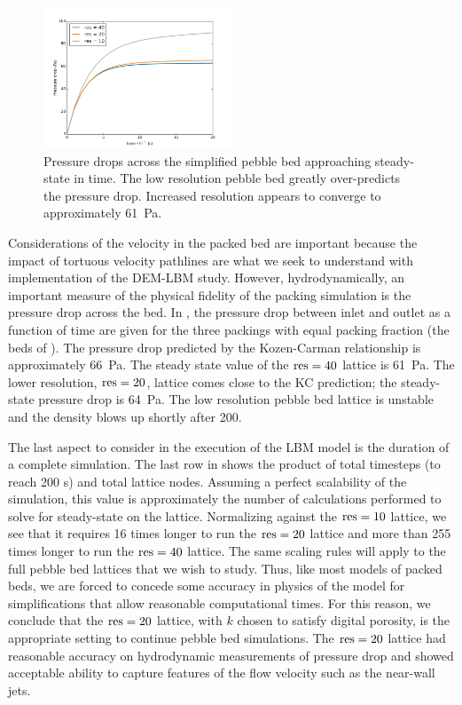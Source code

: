 \begin{figure}[h]
    \centering
    \includegraphics[width=0.5\textwidth]{figures/lbm/3d-study-pressure-drop}
    \caption{Pressure drops across the simplified pebble bed approaching steady-state in time. The low resolution pebble bed greatly over-predicts the pressure drop. Increased resolution appears to converge to approximately \SI{61}{\pascal}.}\label{fig:3d-study-pressure-drop}
\end{figure}

Considerations of the velocity in the packed bed are important because the impact of tortuous velocity pathlines are what we seek to understand with implementation of the DEM-LBM study. However, hydrodynamically, an important measure of the physical fidelity of the packing simulation is the pressure drop across the bed. In , the pressure drop between inlet and outlet as a function of time are given for the three packings with equal packing fraction (the beds of ). The pressure drop predicted by the Kozen-Carman relationship is approximately \SI{66}{\pascal}. The steady state value of the $\text{res}=40$ lattice is \SI{61}{\pascal}. The lower resolution, $\text{res}=20$, lattice comes close to the KC prediction; the steady-state pressure drop is \SI{64}{\pascal}. The low resolution pebble bed lattice is unstable and the density blows up shortly after \SI{200}{\sec}.

The last aspect to consider in the execution of the LBM model is the duration of a complete simulation. The last row in  shows the product of total timesteps (to reach 200 s) and total lattice nodes. Assuming a perfect scalability of the simulation, this value is approximately the number of calculations performed to solve for steady-state on the lattice. Normalizing against the $\text{res}=10$ lattice, we see that it requires 16 times longer to run the $\text{res} =20$ lattice and more than 255 times longer to run the $\text{res} = 40$ lattice. The same scaling rules will apply to the full pebble bed lattices that we wish to study. Thus, like most models of packed beds, we are forced to concede some accuracy in physics of the model for simplifications that allow reasonable computational times. For this reason, we conclude that the $\text{res} = 20$ lattice, with $k$ chosen to satisfy digital porosity, is the appropriate setting to continue pebble bed simulations. The $\text{res} = 20$ lattice had reasonable accuracy on hydrodynamic measurements of pressure drop and showed acceptable ability to capture features of the flow velocity such as the near-wall jets.


